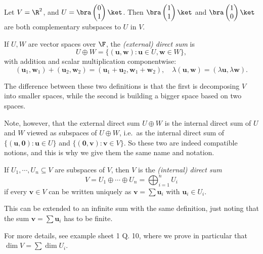 \documentclass[a4paper]{article}
\begin{document}
\begin{eg}
  Let $V = \R^2$, and $U = \bra \begin{pmatrix}0\\1\end{pmatrix}\ket$. Then $\bra \begin{pmatrix}1\\1\end{pmatrix}\ket$ and $\bra \begin{pmatrix}1\\0\end{pmatrix}\ket$ are both complementary subspaces to $U$ in $V$.
\end{eg}

\begin{defi}
  If $U, W$ are vector spaces over $\F$, the \emph{(external) direct sum} is
  \[
    U\oplus W = \{(\mathbf{u}, \mathbf{w}): \mathbf{u}\in U, \mathbf{w}\in W\},
  \]
  with addition and scalar multiplication componentwise:
  \[
    (\mathbf{u}_1, \mathbf{w}_1) + (\mathbf{u}_2, \mathbf{w}_2) = (\mathbf{u}_1 + \mathbf{u}_2, \mathbf{w}_1 + \mathbf{w}_2),\quad \lambda (\mathbf{u}, \mathbf{w}) = (\lambda \mathbf{u}, \lambda \mathbf{w}).
  \]
\end{defi}
The difference between these two definitions is that the first is decomposing $V$ into smaller spaces, while the second is building a bigger space based on two spaces.

Note, however, that the external direct sum $U\oplus W$ is the internal direct sum of $U$ and $W$ viewed as subspaces of $U\oplus W$, i.e.\ as the internal direct sum of $\{(\mathbf{u}, \mathbf{0}): \mathbf{u}\in U\}$ and $\{(\mathbf{0}, \mathbf{v}): \mathbf{v}\in V\}$. So these two are indeed compatible notions, and this is why we give them the same name and notation.

\begin{defi}
  If $U_1, \cdots, U_n\subseteq V$ are subspaces of $V$, then $V$ is the \emph{(internal) direct sum}
  \[
    V = U_1 \oplus \cdots \oplus U_n = \bigoplus_{i = 1}^n U_i
  \]
  if every $\mathbf{v}\in V$ can be written uniquely as $\mathbf{v} = \sum \mathbf{u}_i$ with $\mathbf{u}_i \in U_i$.

  This can be extended to an infinite sum with the same definition, just noting that the sum $\mathbf{v} = \sum \mathbf{u}_i$ has to be finite.
\end{defi}
For more details, see example sheet 1 Q. 10, where we prove in particular that $\dim V = \sum \dim U_i$.
\end{document}
